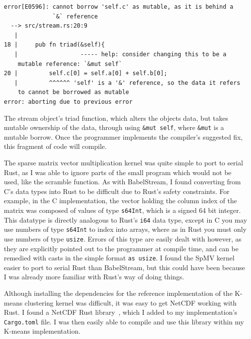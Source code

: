 \begin{code}
\begin{verbatim}
error[E0596]: cannot borrow 'self.c' as mutable, as it is behind a
              `&` reference
  --> src/stream.rs:20:9
   |
18 |     pub fn triad(&self){
   |                  ----- help: consider changing this to be a
    mutable reference: `&mut self`
20 |         self.c[0] = self.a[0] + self.b[0];
   |         ^^^^^^ 'self' is a '&' reference, so the data it refers
    to cannot be borrowed as mutable
error: aborting due to previous error
\end{verbatim}
\label{lst:rustc-borrow}
\end{code}

The stream object's triad function, which alters the objects data, but takes mutable ownership of the data, through using \texttt{\&mut self}, where \texttt{\&mut} is a mutable borrow. Once the programmer implements the compiler's suggested fix, this fragment of code will compile.

The sparse matrix vector multiplication kernel was quite simple to port to serial Rust, as I was able to ignore parts of the small program which would not be used, like the scramble function. As with BabelStream, I found converting from C's data types into Rust to be difficult due to Rust's safety constraints.
For example, in the C implementation, the vector holding the column index of the matrix was composed of values of type \texttt{s64Int}, which is a signed 64 bit integer. This datatype is directly analogous to Rust's \texttt{i64} data type, except in C you may use numbers of type \texttt{s64Int} to index into arrays, where as in Rust you must only use numbers of type \texttt{usize}. Errors of this type are easily dealt with however, as they are explicitly pointed out to the programmer at compile time, and can be remedied with casts in the simple format \texttt{as usize}. I found the SpMV kernel easier to port to serial Rust than BabelStream, but this could have been because I was already more familiar with Rust's way of doing things.

Although installing the dependencies for the reference implementation of the K-means clustering kernel was difficult, it was easy to get NetCDF working with Rust. I found a NetCDF Rust library~\cite{RustNetCDF}, which I added to my implementation's \texttt{Cargo.toml} file. I was then easily able to compile and use this library within my K-means implementation.

